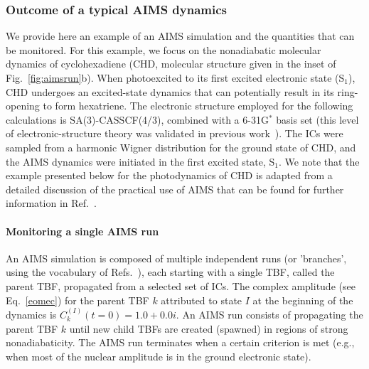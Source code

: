 \documentclass[9pt,bestpractices]{livecoms}
\begin{document}
\subsubsection{Outcome of a typical AIMS dynamics}
\label{sec:aimsoutcome}

We provide here an example of an AIMS simulation and the quantities that can be monitored. For this example, we focus on the nonadiabatic molecular dynamics of cyclohexadiene (CHD, molecular structure given in the inset of Fig.~\ref{fig:aimsrun}b). When photoexcited to its first excited electronic state (S$_1$), CHD undergoes an excited-state dynamics that can potentially result in its ring-opening to form hexatriene. The electronic structure employed for the following calculations is SA(3)-CASSCF(4/3), combined with a 6-31G$^\ast$ basis set (this level of electronic-structure theory was validated in previous work~\cite{kim2011control,kim2015ab,snyder2016gpu}). The ICs were sampled from a harmonic Wigner distribution for the ground state of CHD, and the AIMS dynamics were initiated in the first excited state, S$_1$. We note that the example presented below for the photodynamics of CHD is adapted from a detailed discussion of the practical use of AIMS that can be found for further information in Ref.~.

\paragraph{Monitoring a single AIMS run}

An AIMS simulation is composed of multiple independent runs (or 'branches', using the vocabulary of Refs.~), each starting with a single TBF, called the parent TBF, propagated from a selected set of ICs. The complex amplitude (see Eq.~\eqref{eomec}) for the parent TBF $k$ attributed to state $I$ at the beginning of the dynamics is $C_{k}^{(I)}(t=0)=1.0+0.0i$. An AIMS run consists of propagating the parent TBF $k$ until new child TBFs are created (spawned) in regions of strong nonadiabaticity. The AIMS run terminates when a certain criterion is met (e.g., when most of the nuclear amplitude is in the ground electronic state). 
\end{document}
